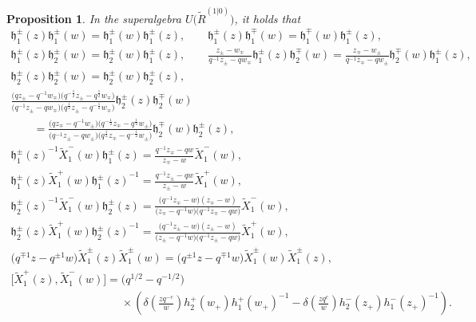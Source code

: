 \documentclass[pdftex]{sigma}
\numberwithin{equation}{section}
\newtheorem{Proposition}[Theorem]{Proposition}
 { \theoremstyle{definition}
\newtheorem{Definition}[Theorem]{Definition}
\newtheorem{Note}[Theorem]{Note}
\newtheorem{Example}[Theorem]{Example}
\newtheorem{Remark}[Theorem]{Remark} }
\begin{document}
\begin{Proposition}In the superalgebra $U\bigl(\widetilde{R}^{(1|0)}\bigr)$, it holds that
\begin{gather*}
 \mathfrak{h}_1^{\pm}(z)\mathfrak{h}_1^{\pm}(w)=\mathfrak{h}_1^{\pm}(w)\mathfrak{h}_1^{\pm}(z),\qquad
 \mathfrak{h}_1^{\pm}(z)\mathfrak{h}_1^{\mp}(w)=\mathfrak{h}_1^{\mp}(w)\mathfrak{h}_1^{\pm}(z),\\
 \mathfrak{h}_1^{\pm}(z)\mathfrak{h}_2^{\pm}(w)=\mathfrak{h}_2^{\pm}(w)\mathfrak{h}_1^{\pm}(z),\qquad
 \frac{z_{\pm}-w_{\mp}}{q^{-1}z_{\pm}-qw_{\mp}}
 \mathfrak{h}_1^{\pm}(z)\mathfrak{h}_2^{\mp}(w)=\frac{z_{\mp}-w_{\pm}}{q^{-1}z_{\mp}-qw_{\pm}}
 \mathfrak{h}_2^{\mp}(w)\mathfrak{h}_1^{\pm}(z),\\
 \mathfrak{h}_2^{\pm}(z)\mathfrak{h}_2^{\pm}(w)=\mathfrak{h}_2^{\pm}(w)\mathfrak{h}_2^{\pm}(z),\\
 \frac{\bigl(qz_{\pm}-q^{-1}w_{\mp}\bigr)\bigl(q^{-\frac{1}{2}}z_{\pm}-q^{\frac{1}{2}}w_{\mp}\bigr)}{\bigl(q^{-1}z_{\pm}-qw_{\mp}\bigr)
 \bigl(q^{\frac{1}{2}}z_{\pm}-q^{-\frac{1}{2}}w_{\mp}\bigr)}\mathfrak{h}_2^{\pm}(z)\mathfrak{h}_2^{\mp}(w)\\
 \qquad
 =\frac{\bigl(qz_{\mp}-q^{-1}w_{\pm}\bigr)\bigl(q^{-\frac{1}{2}}z_{\mp}-q^{\frac{1}{2}}w_{\pm}\bigr)}{\bigl(q^{-1}z_{\pm}-qw_{\pm}\bigr)
 \bigl(q^{\frac{1}{2}}z_{\mp}-q^{-\frac{1}{2}}w_{\pm}\bigr)}\mathfrak{h}_2^{\mp}(w)\mathfrak{h}_2^{\pm}(z),\\
 {\mathfrak{h}_1^{\pm}(z)}^{-1}\widetilde{X}^-_1(w)\mathfrak{h}_1^{\pm}(z)=\frac{q^{-1}z_{\mp}-qw}{z_{\mp}-w}\widetilde{X}^-_1(w),\\
 \mathfrak{h}_1^{\pm}(z)\widetilde{X}^+_1(w){\mathfrak{h}_1^{\pm}(z)}^{-1}=\frac{q^{-1}z_{\pm}-qw}{z_{\pm}-w}\widetilde{X}^+_1(w),
\\
 {\mathfrak{h}_{2}^{\pm}(z)}^{-1}\widetilde{X}_{1}^-(w)\mathfrak{h}_{2}^{\pm}(z)=\frac{\bigl(q^{-1}z_{\mp}-w\bigr)(z_{\mp}-w)}
 {\bigl(z_{\mp}-q^{-1}w\bigr)\bigl(q^{-1}z_{\mp}-qw\bigr)}\widetilde{X}_{1}^-(w),\\
 \label{dr9}
 \mathfrak{h}_{2}^{\pm}(z)\widetilde{X}_{1}^+(w){\mathfrak{h}_{2}^{\pm}(z)}^{-1}=\frac{\bigl(q^{-1}z_{\pm}-w\bigr)(z_{\pm}-w)}
 {\bigl(z_{\pm}-q^{-1}w\bigr)\bigl(q^{-1}z_{\pm}-qw\bigr)}\widetilde{X}_{1}^+(w),\\
\label{dr10}
 \bigl(q^{\mp1}z-q^{\pm1}w\bigr)\widetilde{X}_1^{\pm}(z)\widetilde{X}_1^{\pm}(w)=\bigl(q^{\pm1}z-q^{\mp1}w\bigr)\widetilde{X}_1^{\pm}(w)\widetilde{X}_1^{\pm}(z),\\
 \bigl[\widetilde{X}_1^{+}(z), \widetilde{X}_1^{-}(w)\bigr]=\bigl(q^{1/2}-q^{-1/2}\bigr)\\
 \phantom{ \bigl[\widetilde{X}_1^{+}(z), \widetilde{X}_1^{-}(w)\bigr]=}{}\times\left(\delta\left(\frac{zq^{-c}}{w}\right)h_{2}^+(w_+)h_1^+(w_+)^{-1}
 -\delta\left(\frac{zq^{c}}{w}\right)h_{2}^-(z_+)h_1^-(z_+)^{-1}\right).
\end{gather*}
\end{Proposition}
\end{document}
